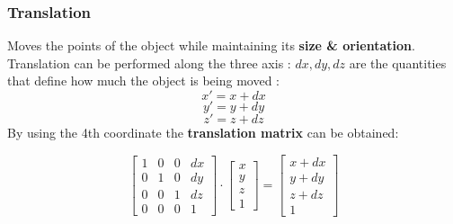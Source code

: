 \subsubsection{Translation}
Moves the points of the object while maintaining its \textbf{size \& orientation}.
Translation can be performed along the three axis : $dx,dy,dz$ are the quantities that define how much the object is being moved : 
$$ x' = x+dx $$
$$ y' = y+dy $$
$$ z' = z+dz $$
By using the 4th coordinate the \textbf{translation matrix} can be obtained:

$$ 	\begin{bmatrix}
       1 & 0 & 0 & dx           \\[0.3em]
       0 & 1 & 0 & dy		    \\[0.3em]
       0 & 0 & 1 & dz			\\[0.3em]
       0 & 0 & 0 & 1
     \end{bmatrix} 
	 \cdot
	 \begin{bmatrix}
	  x  \\
	  y	 \\
	  z  \\ 
	  1
	 \end{bmatrix}	
	 =
	 \begin{bmatrix}
	 x+dx \\
	 y+dy \\
	 z+dz \\
	 1
\end{bmatrix}	       
$$
\newpage
